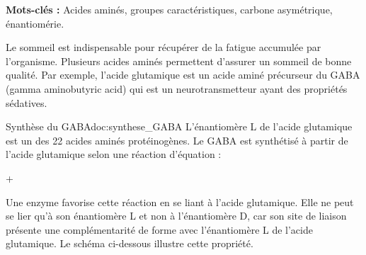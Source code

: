 \label{exo:gaba}

\textbf{Mots-clés :} Acides aminés, groupes caractéristiques, carbone asymétrique, énantiomérie.
\medskip

Le sommeil est indispensable pour récupérer de la fatigue accumulée par l'organisme.
Plusieurs acides aminés permettent d'assurer un sommeil de bonne qualité. Par exemple,
l'acide glutamique est un acide aminé précurseur du GABA (gamma aminobutyric acid) qui
est un neurotransmetteur ayant des propriétés sédatives.

\begin{doc}{Synthèse du GABA}{doc:synthese_GABA}
  L'énantiomère L de l'acide glutamique est un des 22 acides aminés protéinogènes. Le
  GABA est synthétisé à partir de l'acide glutamique selon une réaction d'équation :
  \begin{center}
      \reaction
       + 
  \end{center}
  Une enzyme favorise cette réaction en se liant à l'acide glutamique.
  Elle ne peut se lier qu'à son énantiomère L et non à l'énantiomère D,
  car son site de liaison présente une complémentarité de forme avec l'énantiomère L de l'acide glutamique.
  Le schéma ci-dessous illustre cette propriété.
  \begin{center}
  \end{center}
\end{doc}





